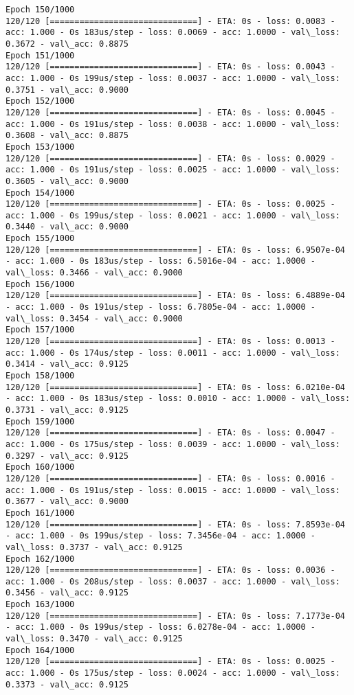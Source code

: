 \documentclass[11pt]{article}
\begin{document}
\begin{Verbatim}[commandchars=\\\{\}]
Epoch 150/1000
120/120 [==============================] - ETA: 0s - loss: 0.0083 - acc: 1.000 - 0s 183us/step - loss: 0.0069 - acc: 1.0000 - val\_loss: 0.3672 - val\_acc: 0.8875
Epoch 151/1000
120/120 [==============================] - ETA: 0s - loss: 0.0043 - acc: 1.000 - 0s 199us/step - loss: 0.0037 - acc: 1.0000 - val\_loss: 0.3751 - val\_acc: 0.9000
Epoch 152/1000
120/120 [==============================] - ETA: 0s - loss: 0.0045 - acc: 1.000 - 0s 191us/step - loss: 0.0038 - acc: 1.0000 - val\_loss: 0.3608 - val\_acc: 0.8875
Epoch 153/1000
120/120 [==============================] - ETA: 0s - loss: 0.0029 - acc: 1.000 - 0s 191us/step - loss: 0.0025 - acc: 1.0000 - val\_loss: 0.3605 - val\_acc: 0.9000
Epoch 154/1000
120/120 [==============================] - ETA: 0s - loss: 0.0025 - acc: 1.000 - 0s 199us/step - loss: 0.0021 - acc: 1.0000 - val\_loss: 0.3440 - val\_acc: 0.9000
Epoch 155/1000
120/120 [==============================] - ETA: 0s - loss: 6.9507e-04 - acc: 1.000 - 0s 183us/step - loss: 6.5016e-04 - acc: 1.0000 - val\_loss: 0.3466 - val\_acc: 0.9000
Epoch 156/1000
120/120 [==============================] - ETA: 0s - loss: 6.4889e-04 - acc: 1.000 - 0s 191us/step - loss: 6.7805e-04 - acc: 1.0000 - val\_loss: 0.3454 - val\_acc: 0.9000
Epoch 157/1000
120/120 [==============================] - ETA: 0s - loss: 0.0013 - acc: 1.000 - 0s 174us/step - loss: 0.0011 - acc: 1.0000 - val\_loss: 0.3414 - val\_acc: 0.9125
Epoch 158/1000
120/120 [==============================] - ETA: 0s - loss: 6.0210e-04 - acc: 1.000 - 0s 183us/step - loss: 0.0010 - acc: 1.0000 - val\_loss: 0.3731 - val\_acc: 0.9125
Epoch 159/1000
120/120 [==============================] - ETA: 0s - loss: 0.0047 - acc: 1.000 - 0s 175us/step - loss: 0.0039 - acc: 1.0000 - val\_loss: 0.3297 - val\_acc: 0.9125
Epoch 160/1000
120/120 [==============================] - ETA: 0s - loss: 0.0016 - acc: 1.000 - 0s 191us/step - loss: 0.0015 - acc: 1.0000 - val\_loss: 0.3677 - val\_acc: 0.9000
Epoch 161/1000
120/120 [==============================] - ETA: 0s - loss: 7.8593e-04 - acc: 1.000 - 0s 199us/step - loss: 7.3456e-04 - acc: 1.0000 - val\_loss: 0.3737 - val\_acc: 0.9125
Epoch 162/1000
120/120 [==============================] - ETA: 0s - loss: 0.0036 - acc: 1.000 - 0s 208us/step - loss: 0.0037 - acc: 1.0000 - val\_loss: 0.3456 - val\_acc: 0.9125
Epoch 163/1000
120/120 [==============================] - ETA: 0s - loss: 7.1773e-04 - acc: 1.000 - 0s 199us/step - loss: 6.0278e-04 - acc: 1.0000 - val\_loss: 0.3470 - val\_acc: 0.9125
Epoch 164/1000
120/120 [==============================] - ETA: 0s - loss: 0.0025 - acc: 1.000 - 0s 175us/step - loss: 0.0024 - acc: 1.0000 - val\_loss: 0.3373 - val\_acc: 0.9125

\end{Verbatim}
\end{document}
